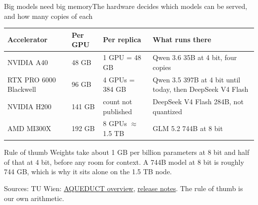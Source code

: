 \documentclass[aspectratio=169]{beamer}
\newcommand{\srcmulti}[1]{\par\vfill{\fontsize{7}{8}\selectfont\color{ACINgray}Sources: #1}}
\begin{document}
\begin{frame}{Big models need big memory}{The hardware decides which models can be served, and how many copies of each}
\footnotesize
\renewcommand{\arraystretch}{1.3}
\begin{tabular}{@{}P{3.3cm}P{1.5cm}P{2.8cm}P{4.9cm}@{}}
\toprule
\textbf{Accelerator} & \textbf{Per GPU} & \textbf{Per replica} & \textbf{What runs there} \\
\midrule
NVIDIA A40 & 48 GB & 1 GPU = 48 GB & Qwen 3.6 35B at 4 bit, four copies \\
RTX PRO 6000 Blackwell & 96 GB & 4 GPUs = 384 GB & Qwen 3.5 397B at 4 bit until today, then DeepSeek V4 Flash \\
NVIDIA H200 & 141 GB & count not published & DeepSeek V4 Flash 284B, not quantized \\
AMD MI300X & 192 GB & 8 GPUs $\approx$ 1.5 TB & GLM 5.2 744B at 8 bit \\
\bottomrule
\end{tabular}

\vspace{3mm}
\begin{block}{Rule of thumb}
Weights take about 1 GB per billion parameters at 8 bit and half of that at 4 bit, before any room for context. A 744B model at 8 bit is roughly 744 GB, which is why it sits alone on the 1.5 TB node.
\end{block}
\srcmulti{TU Wien: \href{https://datalab.tuwien.ac.at/aiml/aqueduct/}{AQUEDUCT overview}, \href{https://datalab.tuwien.ac.at/aiml/aqueduct/release-notes/}{release notes}. The rule of thumb is our own arithmetic.}
\end{frame}
\end{document}
